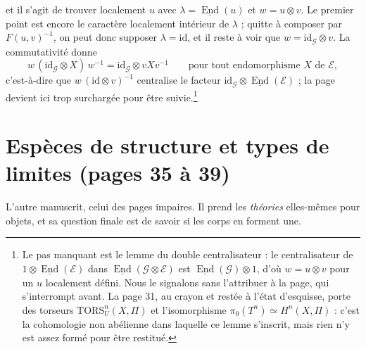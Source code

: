 \documentclass[11pt,a4paper]{article}
\begin{document}

et il s'agit de trouver localement $u$ avec $\lambda =
\underline{\operatorname{End}}(u)$ et $w = u \otimes v$. Le premier point est
encore le caractère localement intérieur de $\lambda$ ; quitte à composer par
$F(u,v)^{-1}$, on peut donc supposer $\lambda = \mathrm{id}$, et il reste à
voir que $w = \mathrm{id}_{\mathcal{G}} \otimes v$. La commutativité donne
\[
w\,(\mathrm{id}_{\mathcal{G}} \otimes X)\,w^{-1}
= \mathrm{id}_{\mathcal{G}} \otimes v X v^{-1}
\qquad \text{pour tout endomorphisme } X \text{ de } \mathcal{E},
\]
c'est-à-dire que $w\,(\mathrm{id} \otimes v)^{-1}$ centralise le facteur
$\mathrm{id}_{\mathcal{G}} \otimes \underline{\operatorname{End}}(\mathcal{E})$ ;
la page devient ici trop surchargée pour être suivie.\footnote{Le pas
manquant est le lemme du double centralisateur : le centralisateur de
$1 \otimes \underline{\operatorname{End}}(\mathcal{E})$ dans
$\underline{\operatorname{End}}(\mathcal{G} \otimes \mathcal{E})$ est
$\underline{\operatorname{End}}(\mathcal{G}) \otimes 1$, d'où
$w = u \otimes v$ pour un $u$ localement défini. Nous le signalons sans
l'attribuer à la page, qui s'interrompt avant. La page 31, au crayon et restée
à l'état d'esquisse, porte des torseurs $\mathrm{TORS}^{n}_{U}(X,\Pi)$ et
l'isomorphisme $\pi_{0}(T^{n}) \simeq H^{n}(X,\Pi)$ : c'est la cohomologie non
abélienne dans laquelle ce lemme s'inscrit, mais rien n'y est assez formé pour
être restitué.}


\section*{Espèces de structure et types de limites (pages 35 à 39)}

L'autre manuscrit, celui des pages impaires. Il prend les \emph{théories}
elles-mêmes pour objets, et sa question finale est de savoir si les corps en
forment une.
\end{document}
